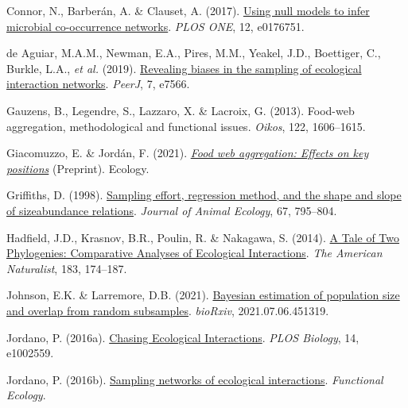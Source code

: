 \documentclass[11pt]{article}
\newlength{\cslhangindent}
\newenvironment{CSLReferences}[3] %
 {%
  \setlength{\parindent}{0pt}
  \ifodd #1 \everypar{\setlength{\hangindent}{\cslhangindent}}\ignorespaces\fi
  \ifnum #2 > 0
  \setlength{\parskip}{#2\baselineskip}
  \fi
 }%
 {}
\begin{document}
\begin{CSLReferences}{1}{0}
\leavevmode{}%
Connor, N., Barberán, A. \& Clauset, A. (2017).
\href{https://doi.org/10.1371/journal.pone.0176751}{Using null models to
infer microbial co-occurrence networks}. \emph{PLOS ONE}, 12, e0176751.

\leavevmode{}%
de Aguiar, M.A.M., Newman, E.A., Pires, M.M., Yeakel, J.D., Boettiger,
C., Burkle, L.A., \emph{et al.} (2019).
\href{https://doi.org/10.7717/peerj.7566}{Revealing biases in the
sampling of ecological interaction networks}. \emph{PeerJ}, 7, e7566.

\leavevmode{}%
Gauzens, B., Legendre, S., Lazzaro, X. \& Lacroix, G. (2013). Food-web
aggregation, methodological and functional issues. \emph{Oikos}, 122,
1606--1615.

\leavevmode{}%
Giacomuzzo, E. \& Jordán, F. (2021).
\emph{\href{https://doi.org/10.1101/2021.04.18.440319}{Food web
aggregation: Effects on key positions}} (Preprint). Ecology.

\leavevmode{}%
Griffiths, D. (1998).
\href{https://doi.org/10.1046/j.1365-2656.1998.00244.x}{Sampling effort,
regression method, and the shape and slope of sizeabundance relations}.
\emph{Journal of Animal Ecology}, 67, 795--804.

\leavevmode{}%
Hadfield, J.D., Krasnov, B.R., Poulin, R. \& Nakagawa, S. (2014).
\href{https://doi.org/10.1086/674445}{A Tale of Two Phylogenies:
Comparative Analyses of Ecological Interactions}. \emph{The American
Naturalist}, 183, 174--187.

\leavevmode{}%
Johnson, E.K. \& Larremore, D.B. (2021).
\href{https://doi.org/10.1101/2021.07.06.451319}{Bayesian estimation of
population size and overlap from random subsamples}. \emph{bioRxiv},
2021.07.06.451319.

\leavevmode{}%
Jordano, P. (2016a).
\href{https://doi.org/10.1371/journal.pbio.1002559}{Chasing Ecological
Interactions}. \emph{PLOS Biology}, 14, e1002559.

\leavevmode{}%
Jordano, P. (2016b).
\href{https://doi.org/10.1111/1365-2435.12763}{Sampling networks of
ecological interactions}. \emph{Functional Ecology}.


\end{CSLReferences}
\end{document}
